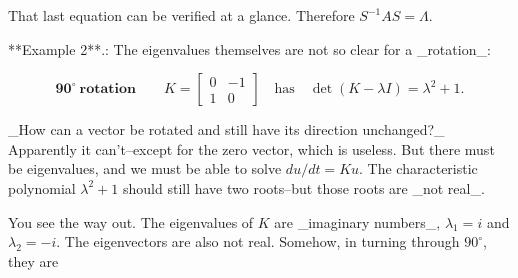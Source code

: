 That last equation can be verified at a glance. Therefore \(S^{-1}AS=\Lambda\).

**Example 2**.: The eigenvalues themselves are not so clear for a _rotation_:

\[\textbf{90}^{\circ}\ \textbf{rotation}\qquad K=\left[\begin{matrix}0&-1\\ 1&0\end{matrix}\right]\quad\text{has}\quad\det(K-\lambda I)=\lambda^{2}+1.\]

_How can a vector be rotated and still have its direction unchanged?_ Apparently it can't--except for the zero vector, which is useless. But there must be eigenvalues, and we must be able to solve \(du/dt=Ku\). The characteristic polynomial \(\lambda^{2}+1\) should still have two roots--but those roots are _not real_.

You see the way out. The eigenvalues of \(K\) are _imaginary numbers_, \(\lambda_{1}=i\) and \(\lambda_{2}=-i\). The eigenvectors are also not real. Somehow, in turning through \(90^{\circ}\), they are 